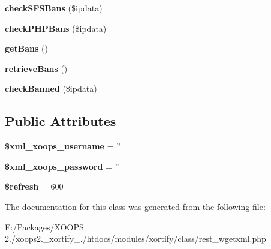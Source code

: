 \begin{DoxyCompactItemize}
\item 
\hypertarget{class_r_e_s_t___w_g_e_t_x_m_l_xortify_exchange_a70aa59a6d0697e84ad810d8796dd5738}{{\bfseries check\-S\-F\-S\-Bans} (\$ipdata)}\label{class_r_e_s_t___w_g_e_t_x_m_l_xortify_exchange_a70aa59a6d0697e84ad810d8796dd5738}

\item 
\hypertarget{class_r_e_s_t___w_g_e_t_x_m_l_xortify_exchange_a6cef20c8fb8c786eff8e767f2745ab2c}{{\bfseries check\-P\-H\-P\-Bans} (\$ipdata)}\label{class_r_e_s_t___w_g_e_t_x_m_l_xortify_exchange_a6cef20c8fb8c786eff8e767f2745ab2c}

\item 
\hypertarget{class_r_e_s_t___w_g_e_t_x_m_l_xortify_exchange_ad2090b04c1f139acdad6432a27eacd89}{{\bfseries get\-Bans} ()}\label{class_r_e_s_t___w_g_e_t_x_m_l_xortify_exchange_ad2090b04c1f139acdad6432a27eacd89}

\item 
\hypertarget{class_r_e_s_t___w_g_e_t_x_m_l_xortify_exchange_a29300e17be5f4f11e6770150cf1f5cb4}{{\bfseries retrieve\-Bans} ()}\label{class_r_e_s_t___w_g_e_t_x_m_l_xortify_exchange_a29300e17be5f4f11e6770150cf1f5cb4}

\item 
\hypertarget{class_r_e_s_t___w_g_e_t_x_m_l_xortify_exchange_a71690d23be9b9ad29a9bc171c2409c83}{{\bfseries check\-Banned} (\$ipdata)}\label{class_r_e_s_t___w_g_e_t_x_m_l_xortify_exchange_a71690d23be9b9ad29a9bc171c2409c83}

\end{DoxyCompactItemize}
\subsection*{Public Attributes}
\begin{DoxyCompactItemize}
\item 
\hypertarget{class_r_e_s_t___w_g_e_t_x_m_l_xortify_exchange_a520ca0642f3fbb0e482bef99d2afacec}{{\bfseries \$xml\-\_\-xoops\-\_\-username} = ''}\label{class_r_e_s_t___w_g_e_t_x_m_l_xortify_exchange_a520ca0642f3fbb0e482bef99d2afacec}

\item 
\hypertarget{class_r_e_s_t___w_g_e_t_x_m_l_xortify_exchange_a04719119c49e2aecb1524d37d68cfb14}{{\bfseries \$xml\-\_\-xoops\-\_\-password} = ''}\label{class_r_e_s_t___w_g_e_t_x_m_l_xortify_exchange_a04719119c49e2aecb1524d37d68cfb14}

\item 
\hypertarget{class_r_e_s_t___w_g_e_t_x_m_l_xortify_exchange_a30dc955d0cbc62bde92a20b0835bdfb5}{{\bfseries \$refresh} = 600}\label{class_r_e_s_t___w_g_e_t_x_m_l_xortify_exchange_a30dc955d0cbc62bde92a20b0835bdfb5}

\end{DoxyCompactItemize}


The documentation for this class was generated from the following file\-:\begin{DoxyCompactItemize}
\item 
E\-:/\-Packages/\-X\-O\-O\-P\-S 2./xoops2.\-\_\-xortify\-\_./htdocs/modules/xortify/class/rest\-\_\-wgetxml.\-php\end{DoxyCompactItemize}

